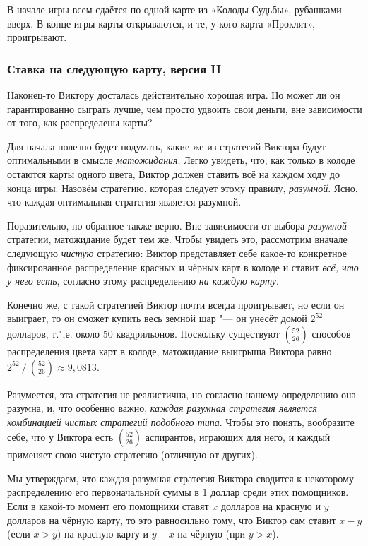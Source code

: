 \documentclass[twoside]{book}
\begin{document}
В начале игры всем сдаётся по одной карте из «Колоды Судьбы», рубашками вверх.
В конце игры карты открываются, и те, у кого карта «Проклят», проигрывают.

\subsubsection*{Ставка на следующую карту, версия II}%

Наконец-то Виктору досталась действительно хорошая игра.
Но может ли он гарантированно сыграть лучше, чем просто удвоить свои деньги, вне зависимости от того, как распределены карты?

\medskip

Для начала полезно будет подумать, какие же из стратегий Виктора будут оптимальными в смысле \emph{матожидания}.
Легко увидеть, что, как только в колоде остаются карты одного цвета, Виктор должен ставить всё на каждом ходу до конца игры.
Назовём стратегию, которая следует этому правилу, \emph{разумной}.
Ясно, что каждая оптимальная стратегия является разумной.

Поразительно, но обратное также верно.
Вне зависимости от выбора \emph{разумной} стратегии, матожидание будет тем же.
Чтобы увидеть это, рассмотрим вначале следующую \emph{чистую} стратегию: Виктор представляет себе какое-то конкретное фиксированное распределение красных и чёрных карт в колоде и ставит \emph{всё, что у него есть}, согласно этому распределению \emph{на каждую карту}.

Конечно же, с такой стратегией Виктор почти всегда проигрывает, но если он выиграет, то он сможет купить весь земной шар "--- он унесёт домой $2^{52}$ долларов, т.",е. около 50 квадрильонов.
Поскольку существуют $\binom{52}{26}$ способов распределения цвета карт в колоде, матожидание выигрыша Виктора равно $2^{52}\mathbin/\binom{52}{26} \approx 9{,}0813$.

Разумеется, эта стратегия не реалистична, но согласно нашему определению она разумна, и, что особенно важно, \emph{каждая разумная стратегия является комбинацией чистых стратегий подобного типа}.
Чтобы это понять, вообразите себе, что у Виктора есть $\binom{52}{26}$ аспирантов, играющих для него, и каждый применяет свою чистую стратегию (отличную от других).

Мы утверждаем, что каждая разумная стратегия Виктора сводится к некоторому распределению  его первоначальной суммы в 1 доллар среди этих помощников.
Если в какой-то момент его помощники ставят $x$ долларов на красную и $y$ долларов на чёрную карту, то это равносильно тому, что Виктор сам ставит $x-y$ (если $x > y$) на красную карту и $y-x$ на чёрную (при $y>x$).
\end{document}
